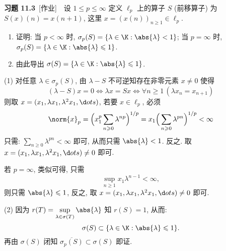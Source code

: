 	\textbf{习题 11.3}\ [作业]\ \ 设 $ 1\leqslant p\leqslant\infty $ 定义 $ \ell_{p} $ 上的算子 $ S $ (前移算子) 为 $ S(x)(n)=x(n+1) $, 这里 $ x=(x(n))_{n\geqslant1}\in\ell_{p} $.
	\begin{enumerate}
		\item 证明: 当 $ p<\infty $ 时, $ \sigma_{p}(S)=\{ \lambda\in\K:\abs{\lambda}<1 \} $; 当 $ p=\infty $ 时, $ \sigma_{p}(S)=\{ \lambda\in\K:\abs{\lambda}\leqslant1 \} $.
		\item 由此导出 $ \sigma(S)=\{ \lambda\in\K:\abs{\lambda}\leqslant1 \} $.
	\end{enumerate}
	\begin{answer}
		(1) 对任意 $ \lambda\in\sigma_{p}(S) $, 由 $ \lambda-S $ 不可逆知存在非零元素 $ x\ne 0 $ 使得
		\[
			(\lambda-S)x=0\Longleftrightarrow \lambda x=Sx\Longleftrightarrow \forall n\geqslant1\,(\lambda x_{n}=x_{n+1})
		\]
		则取 $ x=(x_{1}, \lambda x_{1}, \lambda^{2}x_{1}, \d ots) $, 若要 $ x\in\ell_{p} $, 必须
		\[
			\norm{x}_{p}=\Big( x_{1}^{p}\sum_{n\geqslant0}\lambda^{np} \Big)^{1/p}=x_{1}\Big( \sum_{n\geqslant0}\lambda^{pn} \Big)^{1/p}<\infty
		\]
		只需: $ \sum\limits_{n\geqslant0}\lambda^{pn}<\infty $ 即可, 从而只需 $ \abs{\lambda}<1 $. 反之. 取 $ x=(x_{1}, \lambda x_{1}, \lambda^{2}x_{1}, \d ots)\ne0 $ 即可.

		若 $ p=\infty $, 类似可得, 只需
		\[
			\sup_{n\geqslant1}x_{1}\lambda^{n-1}<\infty,
		\]
		则只需 $ \abs{\lambda}\leqslant1 $, 反之, 取 $ x=(x_{1}, \lambda x_{1}, \lambda^{2}x_{1}, \d ots)\ne 0 $ 即可.

		(2) 因为 $ r(T)=\sup\limits_{\lambda\in\sigma(T)}\abs{\lambda} $ 知 $ r(S)=1 $, 从而:
		\[
			\sigma(S)\subset\{ \lambda\in\K:\abs{\lambda}\leqslant1 \}.
		\]
		再由 $ \sigma(S) $ 闭知 $ \overline{\sigma_{p}(S)}\subset\sigma(S) $ 即证.\qedhere
	\end{answer}


